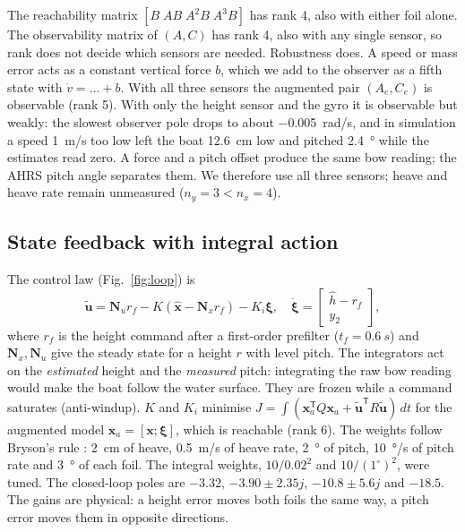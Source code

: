 \documentclass[conference]{IEEEtran}
\newcommand{\T}{^{\mathsf T}}
\begin{document}
The reachability matrix $[B\;AB\;A^2B\;A^3B]$ has rank 4, also with either foil
alone. The observability matrix of $(A,C)$ has rank 4, also with any single
sensor, so rank does not decide which sensors are needed. Robustness does. A
speed or mass error acts as a constant vertical force $b$, which we add to the
observer as a fifth state with $\dot v=\dots+b$. With all three sensors the
augmented pair $(A_e,C_e)$ is observable (rank 5). With only the height sensor
and the gyro it is observable but weakly: the slowest observer pole drops to
about \SI{-0.005}{rad/s}, and in simulation a speed \SI{1}{m/s} too low left the
boat \SI{12.6}{cm} low and pitched \SI{2.4}{\degree} while the estimates read
zero. A force and a pitch offset produce the same bow reading; the AHRS pitch
angle separates them. We therefore use all three sensors; heave and heave rate
remain unmeasured ($n_y=3<n_x=4$).

\subsection{State feedback with integral action}

The control law (Fig.~\ref{fig:loop}) is
\begin{equation}
\tilde{\bm u}=\bm N_u r_f-K(\hat{\bm x}-\bm N_x r_f)-K_i\bm\xi,\quad
\dot{\bm\xi}=\begin{bmatrix}\hat h-r_f\\ y_2\end{bmatrix},
\label{eq:law}
\end{equation}
where $r_f$ is the height command after a first-order prefilter
($t_f=\SI{0.6}{s}$) and $\bm N_x,\bm N_u$ give the steady state for a height
$r$ with level pitch. The integrators act on the \emph{estimated} height and the
\emph{measured} pitch: integrating the raw bow reading would make the boat
follow the water surface. They are frozen while a command saturates
(anti-windup). $K$ and $K_i$ minimise
$J=\int(\bm x_a\T Q\bm x_a+\tilde{\bm u}\T R\tilde{\bm u})\,dt$ for the
augmented model $\bm x_a=[\bm x;\bm\xi]$, which is reachable (rank 6). The
weights follow Bryson's rule \cite{bryson}: \SI{2}{cm} of heave,
\SI{0.5}{m/s} of heave rate, \SI{2}{\degree} of pitch, \SI{10}{\degree/s} of
pitch rate and \SI{3}{\degree} of each foil. The integral weights,
$10/0.02^2$ and $10/(1^\circ)^2$, were tuned. The closed-loop poles are
$-3.32$, $-3.90\pm2.35j$, $-10.8\pm5.6j$ and $-18.5$. The gains are physical:
a height error moves both foils the same way, a pitch error moves them in
opposite directions.
\end{document}
